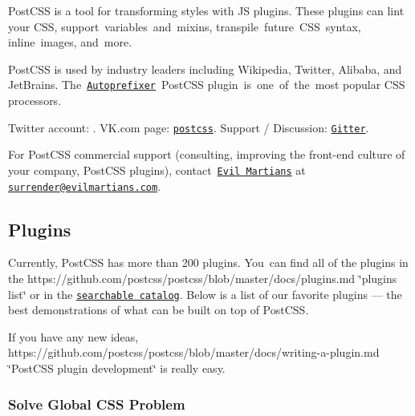 

Post\+C\+SS is a tool for transforming styles with JS plugins. These plugins can lint your C\+SS, support variables and mixins, transpile future \+C\+S\+S syntax, inline images, and more.

Post\+C\+SS is used by industry leaders including Wikipedia, Twitter, Alibaba, and Jet\+Brains. The \href{https://github.com/postcss/autoprefixer}{\tt Autoprefixer} \+Post\+C\+SS plugin is one of the most popular C\+SS processors.

Twitter account\+: \href{https://twitter.com/postcss}{\tt }. V\+K.\+com page\+: \href{https://vk.com/postcss}{\tt postcss}. Support / Discussion\+: \href{https://gitter.im/postcss/postcss}{\tt Gitter}.

For Post\+C\+SS commercial support (consulting, improving the front-\/end culture of your company, Post\+C\+SS plugins), contact \href{https://evilmartians.com/?utm_source=postcss}{\tt Evil Martians} at \href{mailto:surrender@evilmartians.com}{\tt surrender@evilmartians.\+com}.

\href{https://evilmartians.com/?utm_source=postcss}{\tt }

\subsection*{Plugins}

Currently, Post\+C\+SS has more than 200 plugins. You can find all of the plugins in the https\+://github.com/postcss/postcss/blob/master/docs/plugins.\+md \char`\"{}plugins list\char`\"{} or in the \href{http://postcss.parts}{\tt searchable catalog}. Below is a list of our favorite plugins — the best demonstrations of what can be built on top of Post\+C\+SS.

If you have any new ideas, https\+://github.com/postcss/postcss/blob/master/docs/writing-\/a-\/plugin.\+md \char`\"{}\+Post\+C\+S\+S plugin development\char`\"{} is really easy.

\subsubsection*{Solve Global C\+SS Problem}


